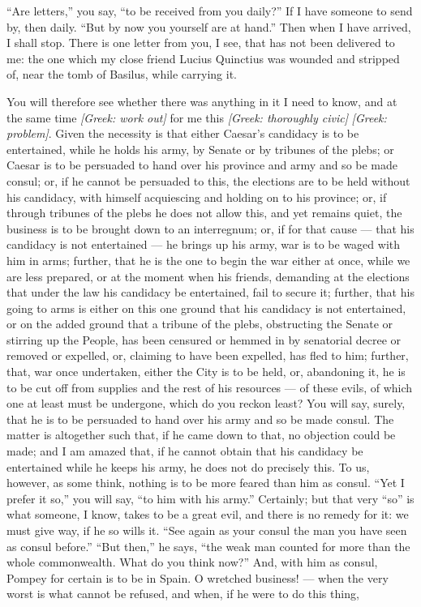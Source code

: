 

 ``Are letters,'' you say, ``to be received from you daily?'' If I have someone to send by, then daily. ``But by now you yourself are at hand.'' Then when I have arrived, I shall stop. There is one letter from you, I see, that has not been delivered to me: the one which my close friend Lucius Quinctius was wounded and stripped of, near the tomb of Basilus, while carrying it.

 You will therefore see whether there was anything in it I need to know, and at the same time \textit{[Greek: work out]} for me this \textit{[Greek: thoroughly civic]} \textit{[Greek: problem]}. Given the necessity is that either Caesar's candidacy is to be entertained, while he holds his army, by Senate or by tribunes of the plebs; or Caesar is to be persuaded to hand over his province and army and so be made consul; or, if he cannot be persuaded to this, the elections are to be held without his candidacy, with himself acquiescing and holding on to his province; or, if through tribunes of the plebs he does not allow this, and yet remains quiet, the business is to be brought down to an interregnum; or, if for that cause --- that his candidacy is not entertained --- he brings up his army, war is to be waged with him in arms; further, that he is the one to begin the war either at once, while we are less prepared, or at the moment when his friends, demanding at the elections that under the law his candidacy be entertained, fail to secure it; further, that his going to arms is either on this one ground that his candidacy is not entertained, or on the added ground that a tribune of the plebs, obstructing the Senate or stirring up the People, has been censured or hemmed in by senatorial decree or removed or expelled, or, claiming to have been expelled, has fled to him; further, that, war once undertaken, either the City is to be held, or, abandoning it, he is to be cut off from supplies and the rest of his resources --- of these evils, of which one at least must be undergone, which do you reckon least? You will say, surely, that he is to be persuaded to hand over his army and so be made consul. The matter is altogether such that, if he came down to that, no objection could be made; and I am amazed that, if he cannot obtain that his candidacy be entertained while he keeps his army, he does not do precisely this. To us, however, as some think, nothing is to be more feared than him as consul. ``Yet I prefer it so,'' you will say, ``to him with his army.'' Certainly; but that very ``so'' is what someone, I know, takes to be a great evil, and there is no remedy for it: we must give way, if he so wills it. ``See again as your consul the man you have seen as consul before.'' ``But then,'' he says, ``the weak man counted for more than the whole commonwealth. What do you think now?'' And, with him as consul, Pompey for certain is to be in Spain. O wretched business! --- when the very worst is what cannot be refused, and when, if he were to do this thing, 